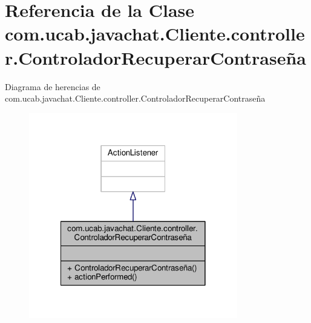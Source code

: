 \hypertarget{classcom_1_1ucab_1_1javachat_1_1_cliente_1_1controller_1_1_controlador_recuperar_contrase_xC3_xB1a}{\section{Referencia de la Clase com.\-ucab.\-javachat.\-Cliente.\-controller.\-Controlador\-Recuperar\-Contraseña}
\label{classcom_1_1ucab_1_1javachat_1_1_cliente_1_1controller_1_1_controlador_recuperar_contrase_xC3_xB1a}
}


Diagrama de herencias de com.\-ucab.\-javachat.\-Cliente.\-controller.\-Controlador\-Recuperar\-Contraseña\nopagebreak
\begin{figure}[H]
\begin{center}
\leavevmode
\includegraphics[width=258pt]{classcom_1_1ucab_1_1javachat_1_1_cliente_1_1controller_1_1_controlador_recuperar_contrase_xC3_xB1a__inherit__graph}
\end{center}
\end{figure}


